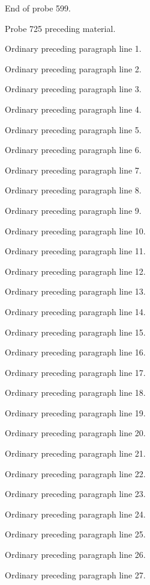 \documentclass[11pt]{article}
\begin{document}
\noindent End of probe 599.\par
\clearpage\noindent Probe 725 preceding material.\par
\noindent Ordinary preceding paragraph line 1.\par
\noindent Ordinary preceding paragraph line 2.\par
\noindent Ordinary preceding paragraph line 3.\par
\noindent Ordinary preceding paragraph line 4.\par
\noindent Ordinary preceding paragraph line 5.\par
\noindent Ordinary preceding paragraph line 6.\par
\noindent Ordinary preceding paragraph line 7.\par
\noindent Ordinary preceding paragraph line 8.\par
\noindent Ordinary preceding paragraph line 9.\par
\noindent Ordinary preceding paragraph line 10.\par
\noindent Ordinary preceding paragraph line 11.\par
\noindent Ordinary preceding paragraph line 12.\par
\noindent Ordinary preceding paragraph line 13.\par
\noindent Ordinary preceding paragraph line 14.\par
\noindent Ordinary preceding paragraph line 15.\par
\noindent Ordinary preceding paragraph line 16.\par
\noindent Ordinary preceding paragraph line 17.\par
\noindent Ordinary preceding paragraph line 18.\par
\noindent Ordinary preceding paragraph line 19.\par
\noindent Ordinary preceding paragraph line 20.\par
\noindent Ordinary preceding paragraph line 21.\par
\noindent Ordinary preceding paragraph line 22.\par
\noindent Ordinary preceding paragraph line 23.\par
\noindent Ordinary preceding paragraph line 24.\par
\noindent Ordinary preceding paragraph line 25.\par
\noindent Ordinary preceding paragraph line 26.\par
\noindent Ordinary preceding paragraph line 27.\par
\end{document}
